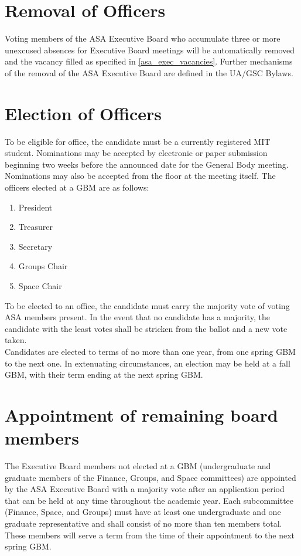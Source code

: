 \documentclass[12pt]{article}
\begin{document}
\section{Removal of Officers}
Voting members of the ASA Executive Board who accumulate three or more unexcused absences for Executive Board
    meetings will be automatically removed and the vacancy filled as specified in \ref{asa_exec_vacancies}.
Further mechanisms of the removal of the ASA Executive Board are defined in the UA/GSC Bylaws.

\section{Election of Officers}
\label{asa_exec_elections}
To be eligible for office, the candidate must be a currently registered MIT student.
Nominations may be accepted by electronic or paper submission beginning two weeks before the announced date for
    the General Body meeting.
Nominations may also be accepted from the floor at the meeting itself.
The officers elected at a GBM are as follows:
\begin{enumerate}
    \item President
    \item Treasurer
    \item Secretary
    \item Groups Chair
    \item Space Chair
\end{enumerate}
To be elected to an office, the candidate must carry the majority vote of voting ASA members present.
In the event that no candidate has a majority, the candidate with the least votes shall be stricken from
    the ballot and a new vote taken.
\\

Candidates are elected to terms of no more than one year, from one spring GBM to the next one.
In extenuating circumstances, an election may be held at a fall GBM, with their term ending at the next
    spring GBM.

\section{Appointment of remaining board members}
The Executive Board members not elected at a GBM (undergraduate and graduate members of the
    Finance, Groups, and Space committees) are appointed by the ASA Executive Board with a majority
    vote after an application period that can be held at any time throughout the academic year.
Each subcommittee (Finance, Space, and Groups) must have at least one undergraduate and one graduate
    representative and shall consist of no more than ten members total.
These members will serve a term from the time of their appointment to the next spring GBM.
\end{document}
